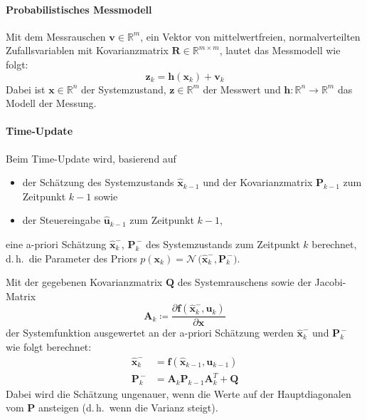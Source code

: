 \documentclass[a4paper, 11pt, accentcolor = tud3b]{tudreport}
\newcommand{\R}{\mathbb{R}}
\newcommand{\mat}[1]{\boldsymbol{#1}}
\renewcommand{\vec}[1]{\boldsymbol{#1}}
\renewcommand{\dh}{d.\,h.~}
\begin{document}
					\paragraph{Probabilistisches Messmodell}
						Mit dem Messrauschen \( \vec{v} \in \R^m \), ein Vektor von mittelwertfreien, normalverteilten Zufallsvariablen mit Kovarianzmatrix \( \mat{R} \in \R^{m \times m} \), lautet das Messmodell wie folgt:
						\begin{equation*}
							\vec{z}_k = \vec{h}(\vec{x}_k) + \vec{v}_k
						\end{equation*}
						Dabei ist \( \vec{x} \in \R^n \) der Systemzustand, \( \vec{z} \in \R^m \) der Messwert und \( \vec{h} : \R^n \to \R^m \) das Modell der Messung.

					\paragraph{Time-Update}
						Beim Time-Update wird, basierend auf
						\begin{itemize}
							\item der Schätzung des Systemzustands \( \hat{\vec{x}}_{k - 1} \) und der Kovarianzmatrix \( \mat{P}_{k - 1} \) zum Zeitpunkt \( k - 1 \) sowie
							\item der Steuereingabe \( \hat{\vec{u}}_{k - 1} \) zum Zeitpunkt \( k - 1 \),
						\end{itemize}
						eine a-priori Schätzung \( \hat{\vec{x}}_k^- \), \( \mat{P}_k^{\,-} \) des Systemzustands zum Zeitpunkt \(k\) berechnet, \dh die Parameter des Priors \( p(\vec{x}_k) = \mathcal{N}\,\big(\hat{\vec{x}}_k^-, \mat{P}_k^{\,-}\big) \).
						
						Mit der gegebenen Kovarianzmatrix \( \mat{Q} \) des Systemrauschens sowie der Jacobi-Matrix
						\begin{equation*}
							\mat{A}_k \coloneqq \frac{\partial \vec{f}(\hat{\vec{x}}_k^-, \vec{u}_k)}{\partial \vec{x}}
						\end{equation*}
						der Systemfunktion ausgewertet an der a-priori Schätzung werden \( \hat{\vec{x}}_k^- \) und \( \mat{P}_k^{\,-} \) wie folgt berechnet:
						\begin{align*}
							\hat{\vec{x}}_k^- & = \vec{f}(\hat{\vec{x}}_{k - 1}, \vec{u}_{k - 1}) \\
							\mat{P}_k^{\,-}       & = \mat{A}_k \mat{P}_{k - 1} \mat{A}_k^T + \mat{Q}
						\end{align*}
						Dabei wird die Schätzung ungenauer, wenn die Werte auf der Hauptdiagonalen vom \( \mat{P} \) ansteigen (\dh wenn die Varianz steigt).
\end{document}
